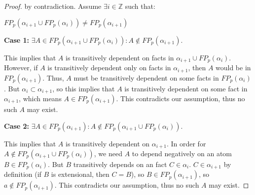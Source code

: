 \begin{proof}



by contradiction. Assume $\exists i \in \mathbb{Z}$ such that:

$FP_p(\alpha_{i+1} \cup FP_p(\alpha_i)) \neq FP_p(\alpha_{i+1})$

{\bf Case 1:} $\exists A \in FP_p(\alpha_{i+1} \cup FP_p(\alpha_i)) : A \not\in FP_p(\alpha_{i+1}).$

This implies that $A$ is transitively dependent on facts in $\alpha_{i+1} \cup
FP_p(\alpha_i)$.  However, if $A$ is transitively dependent only on facts in
$\alpha_{i+1}$, then $A$ would be in $FP_p(\alpha_{i+1})$.  Thus, $A$ must be
transitively dependent on some facts in $FP_p(\alpha_{i})$.  But $\alpha_{i}
\subset \alpha_{i+1}$, so this implies that $A$ is transitively dependent on
some fact in $\alpha_{i+1}$, which means $A \in FP_p(\alpha_{i+1})$.  This
contradicts our assumption, thus no such $A$ may exist.

{\bf Case 2:} $\exists A \in FP_p(\alpha_{i+1}) : A \not\in FP_p(\alpha_{i+1} \cup FP_p(\alpha_i)).$

This implies that $A$ is transitively dependent on $\alpha_{i+1}$.  In order
for $A \not\in FP_p(\alpha_{i+1} \cup FP_p(\alpha_i))$, we need $A$ to depend
negatively on an atom $B \in FP_p(\alpha_i)$.  But $B$ transitively depends on
an fact $C \in \alpha_i$.  $C \in \alpha_{i+1}$ by definition (if $B$ is
extensional, then $C=B$), so $B \in FP_p(\alpha_{i+1})$, so $a \not\in
FP_p(\alpha_{i+1})$.  This contradicts our assumption, thus no such $A$ may
exist.




\end{proof}

